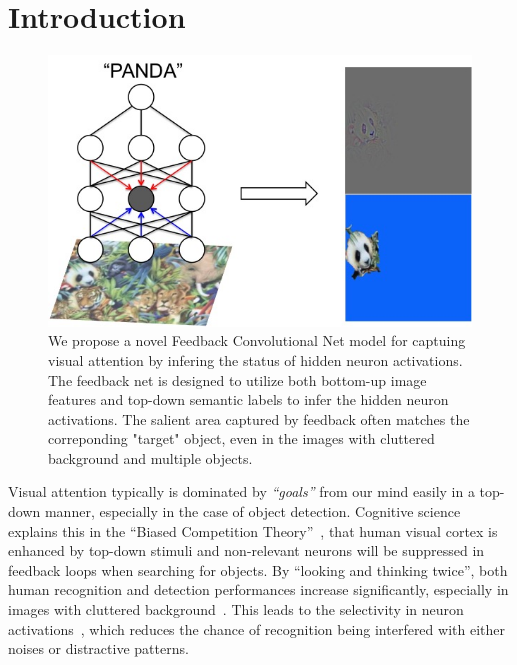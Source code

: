 \section{Introduction}

\begin{center}
\end{center}

\setlength{\tabcolsep}{2pt}
\begin{figure}[htb]
\begin{center}
\includegraphics[width=0.9\columnwidth]{figs/splash0/splash}
\caption{We propose a novel Feedback Convolutional Net model for captuing visual attention by infering the status of hidden neuron activations. The feedback net is designed to utilize both bottom-up image features and top-down semantic labels to infer the hidden neuron activations. The salient area captured by feedback often matches the correponding "target" object, even in the images with cluttered background and multiple objects.}
\label{fig:splash0}
\end{center}
\end{figure}

Visual attention typically is dominated by \emph{``goals''} from our mind easily in a top-down manner, especially in the case of object detection. Cognitive science explains this in the ``Biased Competition Theory''~\cite{beck2009top,desimone1998visual,desimone1995neural}, that human visual cortex is enhanced by top-down stimuli and non-relevant neurons will be suppressed in feedback loops when searching for objects. By ``looking and thinking twice'', both human recognition and detection performances increase significantly, especially in images with cluttered background~\cite{Cichy2014Resolving}. This leads to the selectivity in neuron activations~\cite{Kruger2013Deep}, which reduces the chance of recognition being interfered with either noises or distractive patterns.

